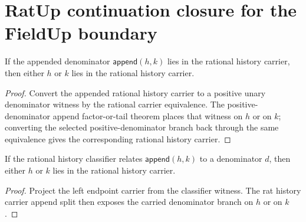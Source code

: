 \section{RatUp continuation closure for the FieldUp boundary}
\label{sec:field-rat-continuation-closure}

\begin{theorem}
\label{thm:rat-history-carrier-append-split}
If the appended denominator $\mathsf{append}(h,k)$ lies in the rational history
carrier, then either $h$ or $k$ lies in the rational history carrier.
\end{theorem}
\begin{proof}
Convert the appended rational history carrier to a positive unary denominator
witness by the rational carrier equivalence. The positive-denominator append
factor-or-tail theorem places that witness on $h$ or on $k$; converting the
selected positive-denominator branch back through the same equivalence gives
the corresponding rational history carrier.
\end{proof}

\begin{theorem}
\label{thm:rat-history-classifier-append-left-split}
If the rational history classifier relates $\mathsf{append}(h,k)$ to a
denominator $d$, then either $h$ or $k$ lies in the rational history carrier.
\end{theorem}
\begin{proof}
Project the left endpoint carrier from the classifier witness. The rat history
carrier append split then exposes the carried denominator branch on $h$ or on
$k$.
\end{proof}

